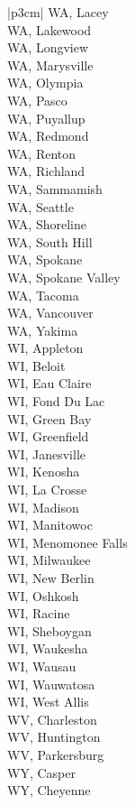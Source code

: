 \begin{customLongTable}{ |p{3cm}| }
WA, Lacey \\ \hline
WA, Lakewood \\ \hline
WA, Longview \\ \hline
WA, Marysville \\ \hline
WA, Olympia \\ \hline
WA, Pasco \\ \hline
WA, Puyallup \\ \hline
WA, Redmond \\ \hline
WA, Renton \\ \hline
WA, Richland \\ \hline
WA, Sammamish \\ \hline
WA, Seattle \\ \hline
WA, Shoreline \\ \hline
WA, South Hill \\ \hline
WA, Spokane \\ \hline
WA, Spokane Valley \\ \hline
WA, Tacoma \\ \hline
WA, Vancouver \\ \hline
WA, Yakima \\ \hline
WI, Appleton \\ \hline
WI, Beloit \\ \hline
WI, Eau Claire \\ \hline
WI, Fond Du Lac \\ \hline
WI, Green Bay \\ \hline
WI, Greenfield \\ \hline
WI, Janesville \\ \hline
WI, Kenosha \\ \hline
WI, La Crosse \\ \hline
WI, Madison \\ \hline
WI, Manitowoc \\ \hline
WI, Menomonee Falls \\ \hline
WI, Milwaukee \\ \hline
WI, New Berlin \\ \hline
WI, Oshkosh \\ \hline
WI, Racine \\ \hline
WI, Sheboygan \\ \hline
WI, Waukesha \\ \hline
WI, Wausau \\ \hline
WI, Wauwatosa \\ \hline
WI, West Allis \\ \hline
WV, Charleston \\ \hline
WV, Huntington \\ \hline
WV, Parkersburg \\ \hline
WY, Casper \\ \hline
WY, Cheyenne \\
\end{customLongTable}
